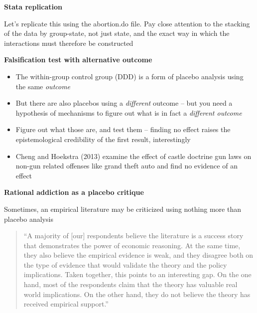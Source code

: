 \documentclass[notes=show]{beamer}
\begin{document}
\begin{frame}[plain]
\begin{center}
\textbf{Stata replication}
\end{center}

Let's replicate this using the abortion.do file. Pay close attention to the stacking of the data by group-state, not just state, and the exact way in which the interactions must therefore be constructed

\end{frame}


\begin{frame}[plain]
	\begin{center}
	\textbf{Falsification test with alternative outcome}
	\end{center}
	
	\begin{itemize}
	\item The within-group control group (DDD) is a form of placebo analysis using the same \emph{outcome}
	\item But there are also placebos using a \emph{different} outcome -- but you need a hypothesis of mechanisms to figure out what is in fact a \emph{different outcome}
	\item Figure out what those are, and test them -- finding no effect raises the epistemological credibility of the first result, interestingly
	\item Cheng and Hoekstra (2013) examine the effect of castle doctrine gun laws on non-gun related offenses like grand theft auto and find no evidence of an effect
	\end{itemize}
\end{frame}



\begin{frame}[plain]
\begin{center}
\textbf{Rational addiction as a placebo critique}
\end{center}


Sometimes, an empirical literature may be criticized using nothing more than placebo analysis

\begin{quote}``A majority of [our] respondents believe the literature is a success story that demonstrates the power of economic reasoning.  At the same time, they also believe the empirical evidence is weak, and they disagree both on the type of evidence that would validate the theory and the policy implications. Taken together, this points to an interesting gap.  On the one hand, most of the respondents claim that the theory has valuable real world implications.  On the other hand, they do not believe the theory has received empirical support.''
\end{quote}

\end{frame}
\end{document}

